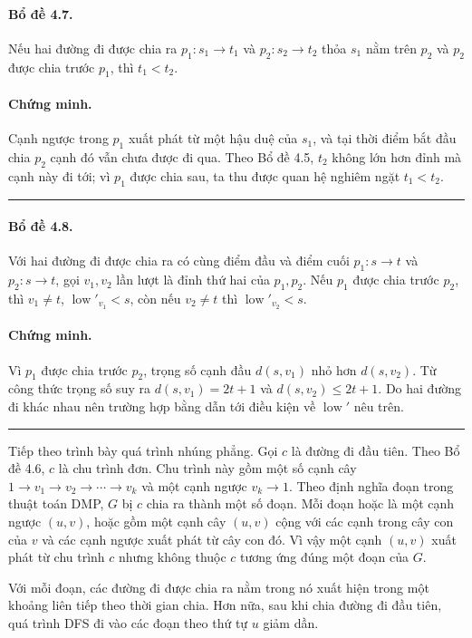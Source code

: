 \documentclass[11pt]{article}
\begin{document}
\paragraph{Bổ đề 4.7.}
Nếu hai đường đi được chia ra $p_1:s_1\to t_1$ và
$p_2:s_2\to t_2$ thỏa $s_1$ nằm trên $p_2$ và $p_2$ được chia trước $p_1$,
thì $t_1<t_2$.

\paragraph{Chứng minh.}
Cạnh ngược trong $p_1$ xuất phát từ một hậu duệ của $s_1$, và tại thời điểm bắt
đầu chia $p_2$ cạnh đó vẫn chưa được đi qua. Theo Bổ đề 4.5, $t_2$ không lớn
hơn đỉnh mà cạnh này đi tới; vì $p_1$ được chia sau, ta thu được quan hệ nghiêm
ngặt $t_1<t_2$.
\hfill\rule{0.55em}{0.55em}

\paragraph{Bổ đề 4.8.}
Với hai đường đi được chia ra có cùng điểm đầu và điểm cuối
$p_1:s\to t$ và $p_2:s\to t$, gọi $v_1,v_2$ lần lượt là đỉnh thứ hai
của $p_1,p_2$. Nếu $p_1$ được chia trước $p_2$, thì $v_1\ne t$,
$\operatorname{low}'_{v_1}<s$, còn nếu $v_2\ne t$ thì
$\operatorname{low}'_{v_2}<s$.

\paragraph{Chứng minh.}
Vì $p_1$ được chia trước $p_2$, trọng số cạnh đầu $d(s,v_1)$ nhỏ hơn
$d(s,v_2)$. Từ công thức trọng số suy ra $d(s,v_1)=2t+1$ và
$d(s,v_2)\le 2t+1$. Do hai đường đi khác nhau nên trường hợp bằng dẫn tới điều
kiện về $\operatorname{low}'$ nêu trên.
\hfill\rule{0.55em}{0.55em}

Tiếp theo trình bày quá trình nhúng phẳng. Gọi $c$ là đường đi đầu tiên. Theo
Bổ đề 4.6, $c$ là chu trình đơn. Chu trình này gồm một số cạnh cây
$1\to v_1\to v_2\to\cdots\to v_k$ và một cạnh ngược $v_k\to 1$. Theo định nghĩa
đoạn trong thuật toán DMP, $G$ bị $c$ chia ra thành một số đoạn. Mỗi đoạn hoặc
là một cạnh ngược $(u,v)$, hoặc gồm một cạnh cây $(u,v)$ cộng với các cạnh
trong cây con của $v$ và các cạnh ngược xuất phát từ cây con đó. Vì vậy một
cạnh $(u,v)$ xuất phát từ chu trình $c$ nhưng không thuộc $c$ tương ứng đúng
một đoạn của $G$.

Với mỗi đoạn, các đường đi được chia ra nằm trong nó xuất hiện trong một khoảng
liên tiếp theo thời gian chia. Hơn nữa, sau khi chia đường đi đầu tiên, quá
trình DFS đi vào các đoạn theo thứ tự $u$ giảm dần.
\end{document}
